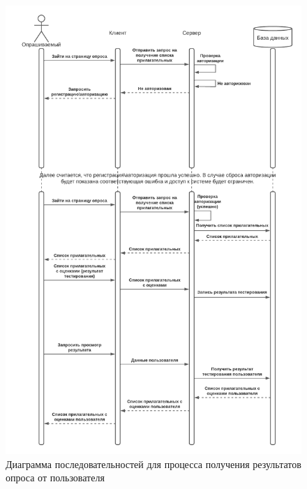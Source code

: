 \begin{center}
	\begin{figure}[H]
		\centering
		\includegraphics[width=\linewidth]{assets/diag-1.png}
		\caption{Диаграмма последовательностей для процесса получения результатов опроса от пользователя}
		\label{fig:diag1}
	\end{figure}
\end{center}

